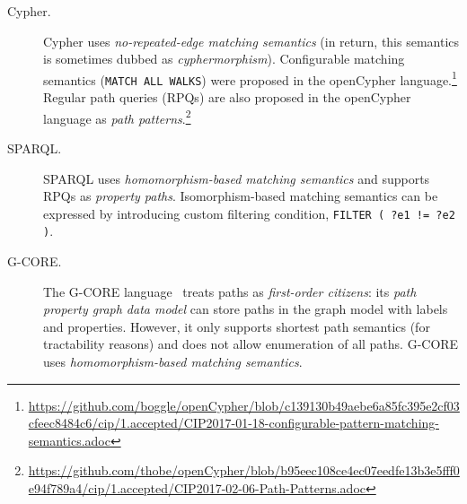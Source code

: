 \begin{description}
\item[Cypher.] Cypher uses \emph{no-repeated-edge matching semantics} (in return, this semantics is sometimes dubbed as \emph{cyphermorphism}).
Configurable matching semantics (\eg \lstinline[language=cypher]{MATCH ALL WALKS}) were proposed in the openCypher language.\footnote{\url{https://github.com/boggle/openCypher/blob/c139130b49aebe6a85fc395e2cf03cfeec8484c6/cip/1.accepted/CIP2017-01-18-configurable-pattern-matching-semantics.adoc}}
Regular path queries (RPQs) are also proposed in the openCypher language as \emph{path patterns}.\footnote{\url{https://github.com/thobe/openCypher/blob/b95eec108ce4ec07eedfe13b3e5fff0e94f789a4/cip/1.accepted/CIP2017-02-06-Path-Patterns.adoc}}

\item[SPARQL.] SPARQL uses \emph{homomorphism-based matching semantics} and supports RPQs as \emph{property paths}. Isomorphism-based matching semantics can be expressed by introducing custom filtering condition, \eg \lstinline[language=sparql]{FILTER ( ?e1 != ?e2 )}.

\item[G-CORE.] The \mbox{G-CORE} language~\cite{DBLP:conf/sigmod/AnglesABBFGLPPS18} treats paths as \emph{first-order citizens}: its \emph{path property graph data model} can store paths in the graph model with labels and properties. However, it only supports shortest path semantics (for tractability reasons) and does not allow enumeration of all paths. \mbox{G-CORE} uses \emph{homomorphism-based matching semantics}.
\end{description}



